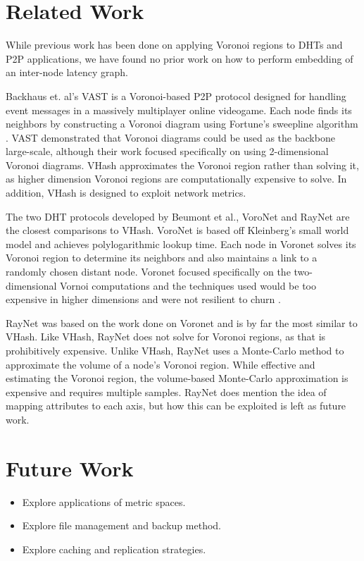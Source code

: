 \documentclass{IEEEtran}
\begin{document}
\section{Related Work}
While previous work has been done on applying Voronoi regions to DHTs and P2P applications, we have found no prior work on how to perform embedding of an inter-node latency graph.   

Backhaus et. al's  VAST \cite{Backhaus:2007:VAS:1326257.1326266} is a Voronoi-based P2P protocol designed for handling event messages in a massively multiplayer online videogame.  
Each node finds its neighbors by constructing a Voronoi diagram using Fortune's sweepline algorithm \cite{fortune1987sweepline}.  
VAST demonstrated that Voronoi diagrams could be used as the backbone  large-scale, although their work focused specifically on using 2-dimensional Voronoi diagrams.  
VHash approximates the Voronoi region rather than solving it, as higher dimension Voronoi regions are computationally expensive to solve.
In addition, VHash is designed to exploit network metrics.

The two DHT protocols developed by Beumont et al., VoroNet \cite{voronet} and RayNet \cite{raynet} are the closest comparisons to VHash.
VoroNet is based off Kleinberg's small world model \cite{kleinberg2000navigation} and achieves polylogarithmic lookup time.  
Each node in Voronet solves its Voronoi region to determine its neighbors and also maintains a link to a randomly chosen distant node.
Voronet focused specifically on the two-dimensional Vornoi computations and the techniques used would be too expensive in higher dimensions and were not resilient to churn  \cite{raynet}.

RayNet \cite{raynet} was based on the work done on Voronet and is by far the most similar to VHash.  
Like VHash, RayNet does not solve for Voronoi regions, as that is prohibitively expensive.  
Unlike VHash, RayNet uses a Monte-Carlo method to approximate the volume of a node's Voronoi region.  
While effective and estimating the Voronoi region,  the volume-based Monte-Carlo approximation is expensive and requires multiple samples. 
RayNet does mention the idea of mapping attributes to each axis, but how this can be exploited is left as future work.



 

\section{Future Work}
\begin{itemize}
\item Explore applications of metric spaces.
\item Explore file management and backup method.
\item Explore caching and replication strategies.
\end{itemize}





\end{document}
